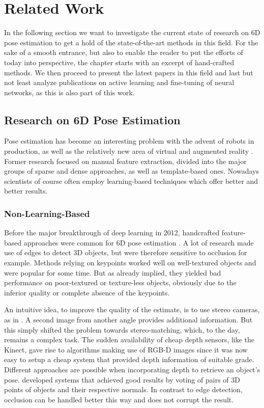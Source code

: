 \chapter{Related Work}

In the following section we want to investigate the current state of research on 6D pose estimation to get a hold of the state-of-the-art methods in this field. For the sake of a smooth entrance, but also to enable the reader to put the efforts of today into perspective, the chapter starts with an excerpt of hand-crafted methods. We then proceed to present the latest papers in this field and last but not least analyze publications on active learning and fine-tuning of neural networks, as this is also part of this work.

\section{Research on 6D Pose Estimation}

Pose estimation has become an interesting problem with the advent of robots in production, as well as the relatively new area of virtual and augmented reality \cite{bb8}. Former research focused on manual feature extraction, divided into the major groups of sparse and dense approaches, as well as template-based ones. Nowadays scientists of course often employ learning-based techniques which offer better and better results.

\subsection{Non-Learning-Based}

Before the major breakthrough of deep learning in 2012, handcrafted feature-based approaches were common for 6D pose estimation \cite{ylecun}. A lot of research \cite{gklein,dglowe2,charris} made use of edges to detect 3D objects, but were therefore sensitive to occlusion for example. Methods relying on keypoints \cite{dglowe1, dwagner} worked well on well-textured objects and were popular for some time. But as already implied, they yielded bad performance on poor-textured or texture-less objects, obviously due to the inferior quality or complete absence of the keypoints. 

An intuitive idea, to improve the quality of the estimate, is to use stereo cameras, as in \cite{kpauwels}. A second image from another angle provides additional information. But this simply shifted the problem towards stereo-matching, which, to the day, remains a complex task. The sudden availability of cheap depth sensors, like the Kinect, gave rise to algorithms making use of RGB-D images since it was now easy to setup a cheap system that provided depth information of suitable grade. Different approaches are possible when incorporating depth to retrieve an object's pose. \cite{bdrost, salasmoreno} developed systems that achieved good results by voting of pairs of 3D points of objects and their respective normals. In contrast to edge detection, occlusion can be handled better this way and does not corrupt the result. 

